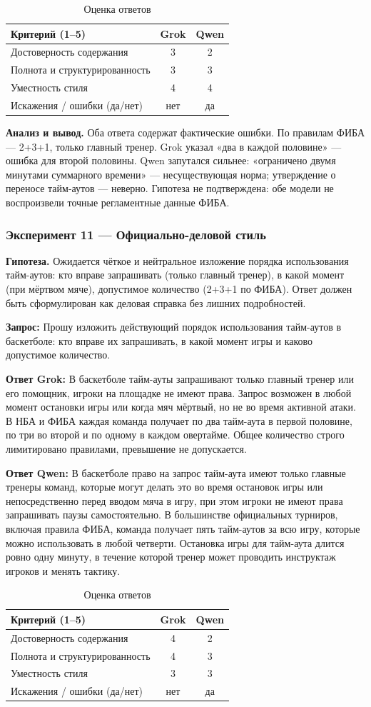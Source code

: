 \documentclass[a4paper, final]{article}
\newcommand{\scoretablefilled}[8]{%
    \vspace{4pt}
    \begin{table}[h!]
    \centering
    \small
    \begin{tabular}{|l|c|c|}
    \hline
    \textbf{Критерий (1--5)} & \textbf{Grok} & \textbf{Qwen} \\
    \hline
    Достоверность содержания & #1 & #2 \\
    \hline
    Полнота и структурированность & #3 & #4 \\
    \hline
    Уместность стиля & #5 & #6 \\
    \hline
    Искажения / ошибки (да/нет) & #7 & #8 \\
    \hline
    \end{tabular}
    \caption{Оценка ответов}
    \end{table}
    \vspace{2pt}
}
\begin{document}
\scoretablefilled{3}{2}{3}{3}{4}{4}{нет}{да}

\noindent\textbf{Анализ и вывод.} Оба ответа содержат фактические ошибки. По правилам ФИБА — 2+3+1, только главный тренер. Grok указал «два в каждой половине» — ошибка для второй половины. Qwen запутался сильнее: «ограничено двумя минутами суммарного времени» — несуществующая норма; утверждение о переносе тайм-аутов — неверно. Гипотеза не подтверждена: обе модели не воспроизвели точные регламентные данные ФИБА.

\newpage

\subsubsection{Эксперимент 11 — Официально-деловой стиль}

\noindent\textbf{Гипотеза.} Ожидается чёткое и нейтральное изложение порядка использования тайм-аутов: кто вправе запрашивать (только главный тренер), в какой момент (при мёртвом мяче), допустимое количество (2+3+1 по ФИБА). Ответ должен быть сформулирован как деловая справка без лишних подробностей.

\noindent\textbf{Запрос:} Прошу изложить действующий порядок использования тайм-аутов в баскетболе: кто вправе их запрашивать, в какой момент игры и каково допустимое количество.

\noindent\textbf{Ответ Grok:} В баскетболе тайм-ауты запрашивают только главный тренер или его помощник, игроки на площадке не имеют права. Запрос возможен в любой момент остановки игры или когда мяч мёртвый, но не во время активной атаки. В НБА и ФИБА каждая команда получает по два тайм-аута в первой половине, по три во второй и по одному в каждом овертайме. Общее количество строго лимитировано правилами, превышение не допускается.

\noindent\textbf{Ответ Qwen:} В баскетболе право на запрос тайм-аута имеют только главные тренеры команд, которые могут делать это во время остановок игры или непосредственно перед вводом мяча в игру, при этом игроки не имеют права запрашивать паузы самостоятельно. В большинстве официальных турниров, включая правила ФИБА, команда получает пять тайм-аутов за всю игру, которые можно использовать в любой четверти. Остановка игры для тайм-аута длится ровно одну минуту, в течение которой тренер может проводить инструктаж игроков и менять тактику.

\scoretablefilled{4}{2}{4}{3}{3}{3}{нет}{да}
\end{document}

